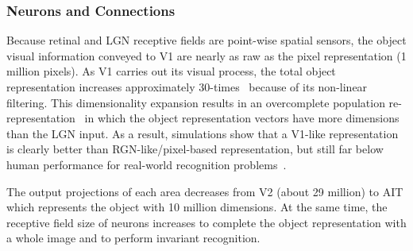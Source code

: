 \subsubsection{Neurons and Connections}
Because retinal and LGN receptive fields are point-wise spatial sensors, the object visual information conveyed to V1 are nearly as raw as the pixel representation (1 million pixels). 
As V1 carries out its visual process, the total object representation increases approximately 30-times~\cite{stevens2001evolutionary} because of its non-linear filtering.
This dimensionality expansion results in an overcomplete population re-representation~\cite{lewicki2000learning} in which the object representation vectors have more dimensions than the LGN input.
As a result, simulations show that a V1-like representation is clearly better than RGN-like/pixel-based representation, but still far below human performance for real-world recognition problems~\cite{dicarlo2007untangling}.

The output projections of each area decreases from V2 (about 29 million) to AIT which represents the object with 10 million dimensions.
At the same time, the receptive field size of neurons increases to complete the object representation with a whole image and to perform invariant recognition.

